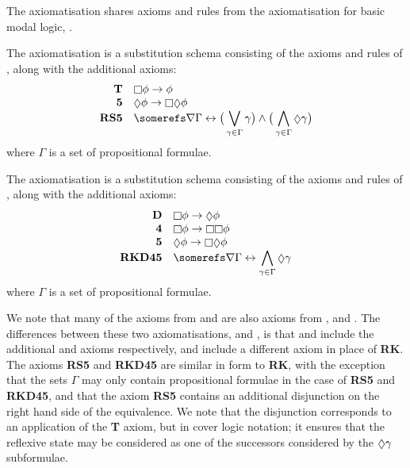 The axiomatisation \axiomKiF{} shares axioms and rules from the axiomatisation
for basic modal logic, \axiomK{}. 

\begin{definition}
The axiomatisation \axiomSiF{} is a substitution schema consisting of the axioms
and rules of \axiomFi{}, along with the additional axioms:
$$
\begin{array}{rl}
{\bf T} & \knows \phi \implies \phi\\
{\bf 5} & \suspects \phi \implies \knows \suspects \phi\\
{\bf RS5} & \displaystyle \somerefs \covers \Gamma \iff \big( \bigvee_{\gamma \in \Gamma}
\gamma \big) \land 
\big( \bigwedge_{\gamma \in \Gamma} \suspects \gamma \big)
\end{array}
$$
where $\Gamma$ is a set of propositional formulae.
\end{definition}

\begin{definition}
The axiomatisation \axiomKDiF{} is a substitution schema consisting of the axioms
and rules of \axiomFi{}, along with the additional axioms:
$$
\begin{array}{rl}
{\bf D} & \knows \phi \implies \suspects \phi\\
{\bf 4} & \knows \phi \implies \knows \knows \phi\\
{\bf 5} & \suspects \phi \implies \knows \suspects \phi\\
{\bf RKD45} & \displaystyle \somerefs \covers \Gamma \iff \bigwedge_{\gamma \in \Gamma} \suspects \gamma
\end{array}
$$
where $\Gamma$ is a set of propositional formulae.
\end{definition}

We note that many of the axioms from \axiomSiF{} and \axiomKDiF{} are also
axioms from \axiomS{}, \axiomKD{} and \axiomKiF{}. The differences between
these two axiomatisations, and \axiomKiF{}, is that \axiomSiF{} and \axiomKDiF{}
include the additional \axiomS{} and \axiomKD{} axioms respectively, and include
a different axiom in place of {\bf RK}. The axioms {\bf RS5} and {\bf RKD45} are
similar in form to {\bf RK}, with the exception that the sets $\Gamma$ may only
contain propositional formulae in the case of {\bf RS5} and {\bf RKD45}, and
that the axiom {\bf RS5} contains an additional disjunction on the right hand
side of the equivalence. We note that the disjunction corresponds to an
application of the {\bf T} axiom, but in cover logic notation; it ensures that
the reflexive state may be considered as one of the successors considered by the
$\suspects \gamma$ subformulae.

